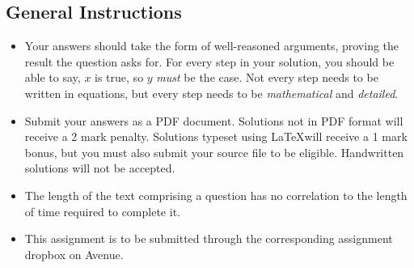 \documentclass{exam}
\begin{document}
\begin{center}
\end{center}

\subsection*{General Instructions}
\begin{itemize}
\item Your answers should take the form of well-reasoned arguments, proving the result the question asks for.  For every step in your solution, you should be able to say, $x$ is true, so $y$ \emph{must} be the case.  Not every step needs to be written in equations, but every step needs to be \emph{mathematical} and \emph{detailed}.  
\item Submit your answers as a PDF document.  Solutions not in PDF format will receive a 2 mark penalty.  Solutions typeset using \LaTeX will receive a 1 mark bonus, but you must also submit your source file to be eligible.  Handwritten solutions will not be accepted.   
\item The length of the text comprising a question has no correlation to the length of time required to complete it.   
\item This assignment is to be submitted through the corresponding assignment dropbox on Avenue.  
\end{itemize}
\end{document}

